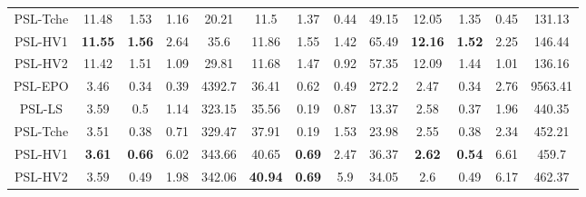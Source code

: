\begin{table}[]
\begin{tabular}{ccccccccccccc}
PSL-Tche&        11.48         &              1.53         &             1.16    &        20.21 &      11.5          &              1.37         &             0.44    &        49.15 &      12.05         &              1.35         &             0.45    &        131.13\\
PSL-HV1 &        \textbf{11.55}&              \textbf{1.56}&             2.64    &        35.6  &      11.86         &              1.55         &             1.42    &        65.49 &      \textbf{12.16}&              \textbf{1.52}&             2.25    &        146.44\\
PSL-HV2 &        11.42         &              1.51         &             1.09    &        29.81 &      11.68         &              1.47         &             0.92    &        57.35 &      12.09         &              1.44         &             1.01    &        136.16\\
PSL-EPO &        3.46          &              0.34         &             0.39    &        4392.7&      36.41         &              0.62         &             0.49    &        272.2 &      2.47          &              0.34         &             2.76    &        9563.41\\
PSL-LS  &        3.59          &              0.5          &             1.14    &        323.15&      35.56         &              0.19         &             0.87    &        13.37 &      2.58          &              0.37         &             1.96    &        440.35\\
PSL-Tche&        3.51          &              0.38         &             0.71    &        329.47&      37.91         &              0.19         &             1.53    &        23.98 &      2.55          &              0.38         &             2.34    &        452.21\\
PSL-HV1 &        \textbf{3.61} &              \textbf{0.66}&             6.02    &        343.66&      40.65         &              \textbf{0.69}&             2.47    &        36.37 &      \textbf{2.62} &              \textbf{0.54}&             6.61    &        459.7\\
PSL-HV2 &        3.59          &              0.49         &             1.98    &        342.06&      \textbf{40.94}&              \textbf{0.69}&             5.9     &        34.05 &      2.6           &              0.49         &             6.17    &        462.37\\

\end{tabular}
\end{table}

